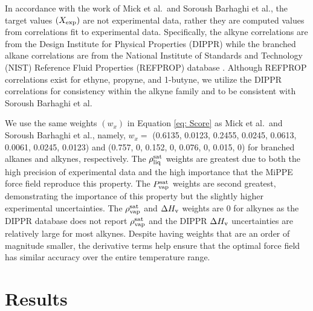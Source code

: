 \documentclass[journal=jced,manuscript=article]{achemso}
\begin{document}
In accordance with the work of Mick et al.\cite{Potoff_branched}~and Soroush Barhaghi et al.\cite{Barhaghi2017}, the target values $(X_{\rm exp})$ are not experimental data, rather they are computed values from correlations fit to experimental data. Specifically, the alkyne correlations are from the Design Institute for Physical Properties (DIPPR) \cite{DIPPR} while the branched alkane correlations are from the National Institute of Standards and Technology (NIST) Reference Fluid Properties (REFPROP) database \cite{LEMMON-RP10,Lemmon2006,Blackham2017,Gao2017}. Although REFPROP correlations exist for ethyne\cite{Gao2017}, propyne\cite{Gao2017}, and 1-butyne\cite{Polt1992}, we utilize the DIPPR correlations for consistency within the alkyne family and to be consistent with Soroush Barhaghi et al.  

We use the same weights $(w_x)$ in Equation \ref{eq: Score} as Mick et al.\cite{Potoff_branched}~and Soroush Barhaghi et al.\cite{Barhaghi2017}, namely, $w_x =$ (0.6135, 0.0123, 0.2455, 0.0245, 0.0613, 0.0061, 0.0245, 0.0123) and (0.757, 0, 0.152, 0, 0.076, 0, 0.015, 0) for branched alkanes and alkynes, respectively. The $\rho_{\rm liq}^{\rm sat}$ weights are greatest due to both the high precision of experimental data and the high importance that the MiPPE force field reproduce this property. The $P_{\rm vap}^{\rm sat}$ weights are second greatest, demonstrating the importance of this property but the slightly higher experimental uncertainties. The $\rho_{\rm vap}^{\rm sat}$ and $\Delta H_{\rm v}$ weights are 0 for alkynes as the DIPPR database does not report $\rho_{\rm vap}^{\rm sat}$ and the DIPPR $\Delta H_{\rm v}$ uncertainties are relatively large for most alkynes. Despite having weights that are an order of magnitude smaller, the derivative terms help ensure that the optimal force field has similar accuracy over the entire temperature range. 


\section{Results} \label{sec: Results}
\end{document}
